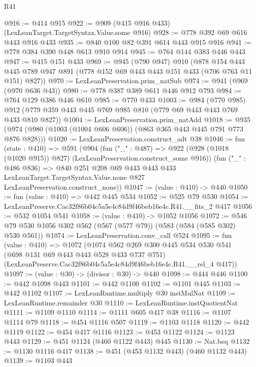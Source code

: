 \begin{lexlean}{R41}
\begin{coremodule}
@916 := @414 @915
@922 := @909 (@415 @916 @433) (LexLeanTarget.TargetSyntax.Value.some @916)
@928 := @778 @392 @69 @616 @443 @916 @433
@935 := @840 @100 @82 @391 @614 @443 @915 @916
@941 := @778 @384 @390 @448 @613 @910 @914
@945 := @764 @144 @383 @446 @443
@947 := @415 @151 @433
@969 := @945
    (@790 @947)
    @910
    (@878
      @154
      @443
      @445
      @789
      @947
      @891
      (@778 @152 @69 @443 @443 @151 @433 (@706 @763 @11 @151) @827))
@970 := LexLeanPreservation.prim_natSub
@974 := @941 (@969 (@970 @636 @43))
@980 := @778 @387 @389 @611 @446 @912 @793
@984 := @764 @129 @386 @446 @610
@985 := @770 @433
@1003 := @984
    (@770 @985)
    @912
    (@779 @359 @443 @445 @769 @985 @810 (@779 @69 @443 @443 @769 @433 @810 @827))
@1004 := LexLeanPreservation.prim_natAdd
@1018 := @935 (@974 (@980 (@1003 (@1004 @606 @606)) (@863 @365 @443 @445 @791 @773 @876 @828)))
@1020 := LexLeanPreservation.construct_adt @38
@1046 := fun (state : @410) =>
  @591
    (@904
      (fun ("_" : @487) =>
      @922 (@928 (@1018 (@1020 @915)) @827) (LexLeanPreservation.construct_some @916))
      (fun ("_" : @486 @836) =>
      @840
        @251
        @208
        @69
        @443
        @443
        @433
        LexLeanTarget.TargetSyntax.Value.none
        @827
        LexLeanPreservation.construct_none))
@1047 := (value : @410) -> @440
@1050 := fun (value : @410) => @442 @445 @534
@1052 := @525 @79 @530
@1054 := LexLeanPreserve.Cac32f86b04c5a5e4c84d9f46beb16e4c.R41.__fits_2 @417
@1056 := @532 @1054 @541
@1058 := (value : @410) -> @1052 @1056
@1072 := @546 @79 @530 @1056 @302 @562 (@567 (@577 @79)) (@583 (@584 (@585 @302) @530 @561))
@1074 := LexLeanPreservation.conv_call @524
@1095 := fun (value : @410) =>
  @1072
    (@1074
      @562
      @269
      @300
      @445
      @534
      @530
      @541
      (@698 @131 @69 @443 @443 @528 @433 @737 @751)
      (LexLeanPreserve.Cac32f86b04c5a5e4c84d9f46beb16e4c.R41.__rel_4 @417))
@1097 := (value : @30) -> (divisor : @30) -> @440
@1098 := @444 @446
@1100 := @442 @1098 @443
@1101 := @442 @1100
@1102 := @1101 @445
@1103 := @442 @1102
@1107 := LexLeanRuntime.multiply @30 instMulNat
@1109 := LexLeanRuntime.remainder @30
@1110 := LexLeanRuntime.instQuotientNat
@1111 := @1109 @1110
@1114 := @1111 @605 @417 @38
@1116 := @1107 @1114 @79
@1118 := @454 @1116 @507
@1119 := @1103 @1118
@1120 := @442 @1119
@1122 := @454 @417 @1116
@1123 := @453 @1122
@1124 := @1123 @443
@1129 := @451 @1124 (@460 @1122 @443) @445
@1130 := Nat.beq
@1132 := @1130 @1116 @417
@1138 := @451 (@453 @1132 @443) (@460 @1132 @443)
@1139 := @1103 @443

\end{coremodule}
\end{lexlean}
